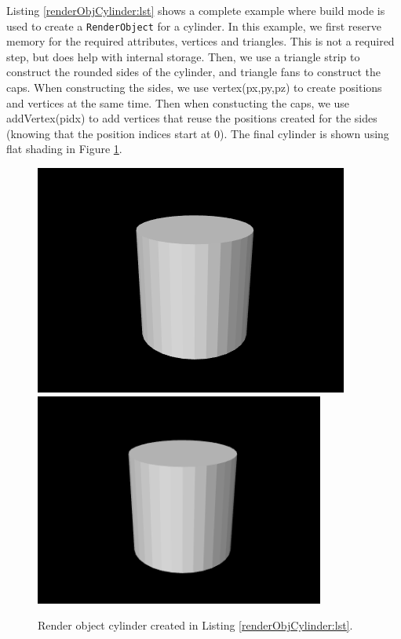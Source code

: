 Listing \ref{renderObjCylinder:lst} shows a complete example where
build mode is used to create a {\tt RenderObject} for a cylinder.  In
this example, we first reserve memory for the required attributes,
vertices and triangles.  This is not a required step, but does help
with internal storage.  Then, we use a triangle strip to construct the
rounded sides of the cylinder, and triangle fans to construct the
caps. When constructing the sides, we use
%
{vertex(px,py,pz)} to create positions and vertices at the same
time. Then when constucting the caps, we use
%
{addVertex(pidx)} to add vertices that reuse the positions created for
the sides (knowing that the position indices start at 0).  The final
cylinder is shown using flat shading in Figure
\ref{renderObjCylinder:fig}.
%
\begin{figure}[t]
\begin{center}
\iflatexml
 \includegraphics[]{images/renderObjCylinder}
\else
 \includegraphics[width=3.75in]{images/renderObjCylinder}
\fi
\end{center}
\caption{Render object cylinder created in Listing \ref{renderObjCylinder:lst}.}
\label{renderObjCylinder:fig}
\end{figure}
